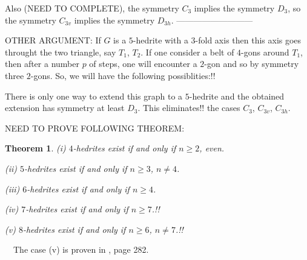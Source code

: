 \documentclass[12pt]{article}
\newtheorem{theor}{Theorem}
\newcommand{\proof}{\noindent{\bf Proof.}\ \ }
\begin{document}
Also (NEED TO COMPLETE), the symmetry $C_3$ implies the symmetry $D_3$, so the symmetry $C_{3v}$ implies the symmetry $D_{3h}$.
---------------------------


OTHER ARGUMENT: If $G$ is a $5$-hedrite with a $3$-fold axis then this axis goes throught the two triangle, say $T_1$, $T_2$. If one consider a belt of $4$-gons around $T_1$, then after a number $p$ of steps, one will encounter a $2$-gon and so by symmetry three $2$-gons. So, we will have the 
following possiblities:!!

\begin{center}
\epsfxsize=60mm
\end{center}

There is only one way to extend this graph to a $5$-hedrite and the obtained extension has symmetry at least $D_3$. This eliminates!! the cases $C_3$, $C_{3v}$, $C_{3h}$.





\begin{center}
\epsfxsize=60mm
\end{center}

\begin{center}
\epsfxsize=60mm
\end{center}








NEED TO PROVE FOLLOWING THEOREM:

\begin{theor}

(i) $4$-hedrites exist if and only if $n\geq 2$, even.

(ii) $5$-hedrites exist if and only if $n\geq 3$, $n\not= 4$.

(iii) $6$-hedrites exist if and only if $n\geq 4$.

(iv) $7$-hedrites exist if and only if $n\geq 7$.!!

(v) $8$-hedrites exist if and only if $n\geq 6$, $n\not= 7$.!!

\end{theor}
\proof The case (v) is proven in \cite{Gr}, page 282.
\end{document}
